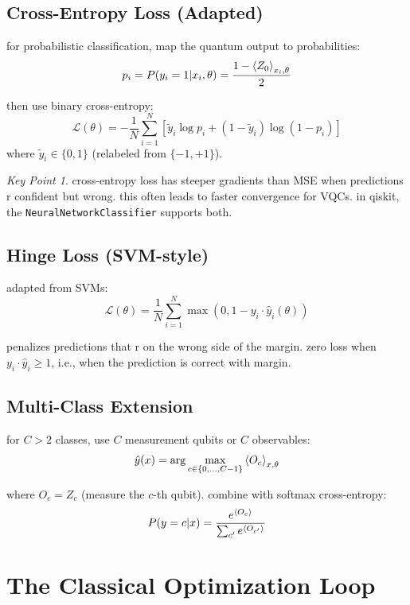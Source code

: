 \documentclass[11pt,a4paper]{article}
\theoremstyle{definition}
\theoremstyle{remark}
\newtheorem*{keypoint}{Key Point}
\begin{document}
\subsection{Cross-Entropy Loss (Adapted)}

for probabilistic classification, map the quantum output to probabilities:
\[
p_i = P(y_i = 1 | x_i, \theta) = \frac{1 - \braket{Z_0}_{x_i, \theta}}{2}
\]

then use binary cross-entropy:
\[
\mathcal{L}(\theta) = -\frac{1}{N}\sum_{i=1}^N\left[\tilde{y}_i \log p_i + (1 - \tilde{y}_i)\log(1 - p_i)\right]
\]
where $\tilde{y}_i \in \{0, 1\}$ (relabeled from $\{-1, +1\}$).

\begin{keypoint}
cross-entropy loss has steeper gradients than MSE when predictions r confident but wrong. this often leads to faster convergence for VQCs. in qiskit, the \texttt{NeuralNetworkClassifier} supports both.
\end{keypoint}

\subsection{Hinge Loss (SVM-style)}

adapted from SVMs:
\[
\mathcal{L}(\theta) = \frac{1}{N}\sum_{i=1}^N \max(0, 1 - y_i \cdot \hat{y}_i(\theta))
\]

penalizes predictions that r on the wrong side of the margin. zero loss when $y_i \cdot \hat{y}_i \geq 1$, i.e., when the prediction is correct with margin.

\subsection{Multi-Class Extension}

for $C > 2$ classes, use $C$ measurement qubits or $C$ observables:
\[
\hat{y}(x) = \arg\max_{c \in \{0, \ldots, C-1\}} \braket{O_c}_{x, \theta}
\]

where $O_c = Z_c$ (measure the $c$-th qubit). combine with softmax cross-entropy:
\[
P(y = c | x) = \frac{e^{\braket{O_c}}}{\sum_{c'} e^{\braket{O_{c'}}}}
\]

\section{The Classical Optimization Loop}
\end{document}
